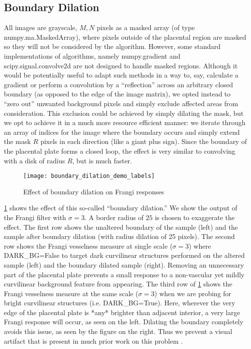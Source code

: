     \subsection{Boundary Dilation} \label{sec:boundary-dilation}
    
    All images are grayscale, $M,N$ pixels as a masked array (of type
    \textrm{numpy.ma.MaskedArray}), where pixels outside of the placental region are masked so they will not be considered by the algorithm. However, some standard
    implementations of algorithms, namely \textrm{numpy.gradient and scipy.signal.convolve2d} are not designed to handle masked regions. Although it would be potentially useful to adapt such methods in a way to, say, calculate a gradient or perform a convolution by a ``reflection'' across an arbitrary closed boundary (as opposed to the edge of the image matrix), we opted instead to ``zero out'' unwanted background pixels and simply exclude affected areas from consideration. This exclusion could be achieved by
    simply dilating the mask, but we opt to achieve it in a much more resource efficient manner: we iterate through an array of indices for the image where the boundary occurs and simply extend the mask $R$ pixels in each direction (like a giant plus sign). Since the boundary of the placental plate forms a closed loop, the effect is very similar to convolving with a disk of radius $R$, but is much faster.
    
    \begin{figure} 
        \texttt{[image: boundary\_dilation\_demo\_labels]}
        \caption{Effect of boundary dilation on Frangi responses}
        \label{fig:boundary-demo}
    \end{figure}
    
    \cref{fig:boundary-demo} shows the effect of this so-called ``boundary dilation.'' 
    We show the output of the Frangi filter with $\sigma=3$. A border radius of $25$ is chosen to exaggerate the effect.
    The first row shows the unaltered boundary of the sample (left) and
        the sample after boundary dilation (with radius dilation of 25 pixels).
    The second row shows the Frangi vesselness measure at single scale ($\sigma=3$) where \textrm{DARK\_BG=False} to target dark curvilinear structures performed on the altered sample (left) and the boundary dilated sample (right). Removing an unnecessary part of
    the placental plate prevents a small response to a non-vascular yet mildly curvilinear
    background feature from appearing.
    The third row of \cref{fig:boundary-demo} shows the Frangi vesselness measure at the same scale ($\sigma=3$) when we are probing for bright curvilinear structures (i.e.
    \textrm{DARK\_BG=True}). Here, wherever the very edge of the placental plate is *any* brighter than adjacent interior, a very large Frangi response will occur, as seen on the left. Dilating the boundary completely avoids this issue, as seen by the figure on the right. Thus we prevent a visual artifact that is present in much prior work on this problem \cite{huynh2013filter,almoussa-ucla-reu}.

